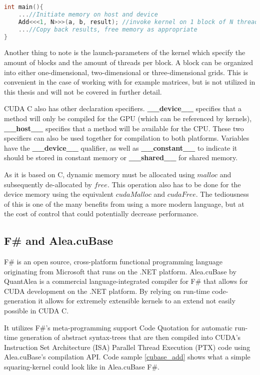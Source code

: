 {\begin{lstlisting}[language=C++, caption=CUDA C addition kernel, label=cuda_add]
int main(){
	...//Initiate memory on host and device
	Add<<<1, N>>>(a, b, result); //invoke kernel on 1 block of N threads
	...//Copy back results, free memory as appropriate
}
\end{lstlisting}

Another thing to note is the launch-parameters of the kernel which specify the amount of blocks and the amount of threads per block. A block can be organized into either one-dimensional, two-dimensional or three-dimensional grids. This is convenient in the case of working with for example matrices, but is not utilized in this thesis and will not be covered in further detail.

CUDA C also has other declaration specifiers. \textbf{\_\_device\_\_} specifies that a method will only be compiled for the GPU (which can be referenced by kernels), \textbf{\_\_host\_\_} specifies that a method will be available for the CPU. These two specifiers can also be used together for compilation to both platforms.
Variables have the \textbf{\_\_device\_\_} qualifier, as well as \textbf{\_\_constant\_\_} to indicate it should be stored in constant memory or \textbf{\_\_shared\_\_} for shared memory.

As it is based on C, dynamic memory must be allocated using $malloc$ and subsequently de-allocated by $free$.
This operation also has to be done for the device memory using the equivalent $cudaMalloc$ and $cudaFree$.
The tediousness of this is one of the many benefits from using a more modern language, but at the cost of control that could potentially decrease performance.

\subsection{F\# and Alea.cuBase}
F\#\cite{fsharp} is an open source, cross-platform functional programming language originating from Microsoft that runs on the .NET platform.
Alea.cuBase by QuantAlea\cite{quantalea} is a commercial language-integrated compiler for F\# that allows for CUDA development on the .NET platform.
By relying on run-time code-generation it allows for extremely extensible kernels to an extend not easily possible in CUDA C.

It utilizes F\#'s meta-programming support Code Quotation\cite{ms:quotations} for automatic run-time generation of abstract syntax-trees that are then compiled into CUDA's Instruction Set Architecture (ISA) Parallel Thread Execution (PTX) code using Alea.cuBase's compilation API.
Code sample \ref{cubase_add} shows what a simple squaring-kernel could look like in Alea.cuBase F\#. 

}
